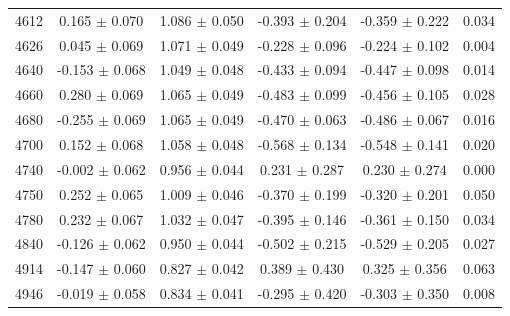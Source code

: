 \begin{table}[h]
{\begin{tabular}{cccccc}
        4612 & 0.165 $\pm$ 0.070 & 1.086 $\pm$ 0.050 & -0.393 $\pm$ 0.204 & -0.359 $\pm$ 0.222 & 0.034\\
        4626 & 0.045 $\pm$ 0.069 & 1.071 $\pm$ 0.049 & -0.228 $\pm$ 0.096 & -0.224 $\pm$ 0.102 & 0.004\\
        4640 & -0.153 $\pm$ 0.068 & 1.049 $\pm$ 0.048 & -0.433 $\pm$ 0.094 & -0.447 $\pm$ 0.098 & 0.014\\
        4660 & 0.280 $\pm$ 0.069 & 1.065 $\pm$ 0.049 & -0.483 $\pm$ 0.099 & -0.456 $\pm$ 0.105 & 0.028\\
        4680 & -0.255 $\pm$ 0.069 & 1.065 $\pm$ 0.049 & -0.470 $\pm$ 0.063 & -0.486 $\pm$ 0.067 & 0.016\\
        4700 & 0.152 $\pm$ 0.068 & 1.058 $\pm$ 0.048 & -0.568 $\pm$ 0.134 & -0.548 $\pm$ 0.141 & 0.020\\
        4740 & -0.002 $\pm$ 0.062 & 0.956 $\pm$ 0.044 & 0.231 $\pm$ 0.287 & 0.230 $\pm$ 0.274 & 0.000\\
        4750 & 0.252 $\pm$ 0.065 & 1.009 $\pm$ 0.046 & -0.370 $\pm$ 0.199 & -0.320 $\pm$ 0.201 & 0.050\\
        4780 & 0.232 $\pm$ 0.067 & 1.032 $\pm$ 0.047 & -0.395 $\pm$ 0.146 & -0.361 $\pm$ 0.150 & 0.034\\
        4840 & -0.126 $\pm$ 0.062 & 0.950 $\pm$ 0.044 & -0.502 $\pm$ 0.215 & -0.529 $\pm$ 0.205 & 0.027\\
        4914 & -0.147 $\pm$ 0.060 & 0.827 $\pm$ 0.042 & 0.389 $\pm$ 0.430 & 0.325 $\pm$ 0.356 & 0.063\\
        4946 & -0.019 $\pm$ 0.058 & 0.834 $\pm$ 0.041 & -0.295 $\pm$ 0.420 & -0.303 $\pm$ 0.350 & 0.008\\
        \hline\hline
        \end{tabular}
        }
\end{table}

